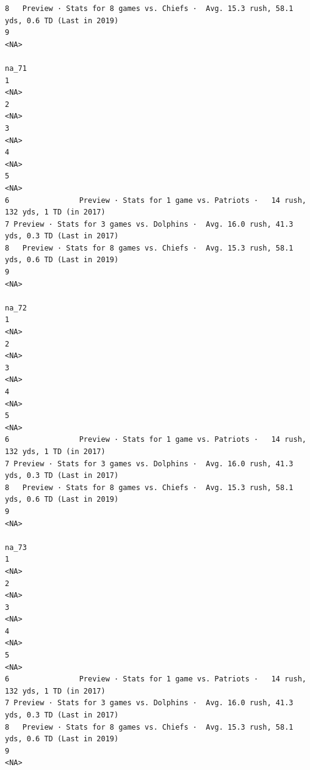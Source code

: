 \documentclass[
]{article}
\begin{document}
\begin{verbatim}
8   Preview · Stats for 8 games vs. Chiefs ·  Avg. 15.3 rush, 58.1 yds, 0.6 TD (Last in 2019)
9                                                                                        <NA>
                                                                                        na_71
1                                                                                        <NA>
2                                                                                        <NA>
3                                                                                        <NA>
4                                                                                        <NA>
5                                                                                        <NA>
6                Preview · Stats for 1 game vs. Patriots ·   14 rush, 132 yds, 1 TD (in 2017)
7 Preview · Stats for 3 games vs. Dolphins ·  Avg. 16.0 rush, 41.3 yds, 0.3 TD (Last in 2017)
8   Preview · Stats for 8 games vs. Chiefs ·  Avg. 15.3 rush, 58.1 yds, 0.6 TD (Last in 2019)
9                                                                                        <NA>
                                                                                        na_72
1                                                                                        <NA>
2                                                                                        <NA>
3                                                                                        <NA>
4                                                                                        <NA>
5                                                                                        <NA>
6                Preview · Stats for 1 game vs. Patriots ·   14 rush, 132 yds, 1 TD (in 2017)
7 Preview · Stats for 3 games vs. Dolphins ·  Avg. 16.0 rush, 41.3 yds, 0.3 TD (Last in 2017)
8   Preview · Stats for 8 games vs. Chiefs ·  Avg. 15.3 rush, 58.1 yds, 0.6 TD (Last in 2019)
9                                                                                        <NA>
                                                                                        na_73
1                                                                                        <NA>
2                                                                                        <NA>
3                                                                                        <NA>
4                                                                                        <NA>
5                                                                                        <NA>
6                Preview · Stats for 1 game vs. Patriots ·   14 rush, 132 yds, 1 TD (in 2017)
7 Preview · Stats for 3 games vs. Dolphins ·  Avg. 16.0 rush, 41.3 yds, 0.3 TD (Last in 2017)
8   Preview · Stats for 8 games vs. Chiefs ·  Avg. 15.3 rush, 58.1 yds, 0.6 TD (Last in 2019)
9                                                                                        <NA>
\end{verbatim}
\end{document}
